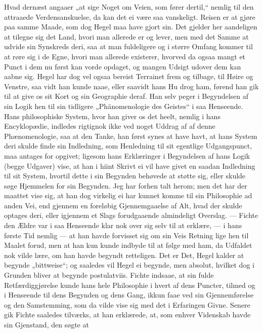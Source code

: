 \documentclass[12pt,a4paper]{book}
\newcommand{\apage}[1]{\marginnote{\footnotesize\textit{[#1]}}}
\begin{document}
Hvad dernæst angaaer „at sige Noget om Veien, som fører dertil,“ nemlig
til den attraaede Verdensanskuelse, da kan det ei være saa vanskeligt.
Reisen er at gjøre paa samme Maade, som dog Hegel maa have gjort sin.
Det gjelder her aandeligen at tilegne sig det Land, hvori man allerede
er og lever, men med det Samme at udvide sin Synskreds deri, saa at man
fuldeligere og i større Omfang kommer til at røre sig i de Egne, hvori
man allerede existerer, hvorved da ogsaa mangt et Punct i dem nu først
kan vorde opdaget, og mangen Udsigt udover dem kan aabne sig. Hegel har
dog vel ogsaa bereist Terrainet frem og tilbage, \apage{57} til Høire og Venstre,
saa vidt han kunde naae, eller saavidt hans Hu drog ham, førend han gik
til at give os sit Kort og sin Geographie deraf. Han selv peger i
Begyndelsen af sin Logik hen til sin tidligere „Phänomenologie des
Geistes“ i saa Henseende. Hans philosophiske System, hvor han giver os
det heelt, nemlig i hans Encyklopædie, indledes rigtignok ikke ved
noget Uddrag af af denne Phænomenologie,
saa at den Tanke, han først synes at have havt, at hans System deri
skulde finde sin Indledning, som Henledning til sit egentlige
Udgangspunct, maa antages for opgivet; ligesom hans Erklæringer i
Begyndelsen af hans Logik (begge Udgaver) vise, at han i hiint Skrivt
ei vil have givet en saadan Indledning til sit System, hvortil dette i
sin Begynden behøvede at støtte sig, eller skulde søge Hjemmelen for
sin Begynden. Jeg har forhen talt herom; men det har der maattet vise
sig, at han dog virkelig ei har kunnet komme til sin Philosophie ad
anden Vei, end gjennem en foreløbig Gjennemgaaelse af Alt, hvad der
skulde optages deri, eller igjennem et Slags forudgaaende almindeligt
Overslag. --- Fichte den Ældre var i saa Henseende klar nok over sig
selv til at erklære, --- i hans første Tid nemlig --- at han havde
forvisset sig om sin Veis Retning lige hen til Maalet forud, men at han
kun kunde indbyde til at følge med ham, da Udfaldet nok vilde lære, om
han havde begyndt retteligen. Det er Det, Hegel kalder at begynde
„bittweise“; og saaledes vil Hegel ei begynde, men absolut, hvilket dog
i Grunden bliver at begynde postulatviis. Fichte indsaae, at sin fulde
Retfærdiggjørelse kunde hans hele Philosophie i hvert af dens Puncter,
tilmed og i Henseende til dens Begynden og dens Gang, ikkun faae ved
sin Gjennemførelse og den Samstemming, som da vilde vise sig med det i
Erfaringen Givne. Senere gik Fichte saaledes tilværks, at han
erklærede, at, som enhver Videnskab havde sin Gjenstand, den søgte at
\end{document}
